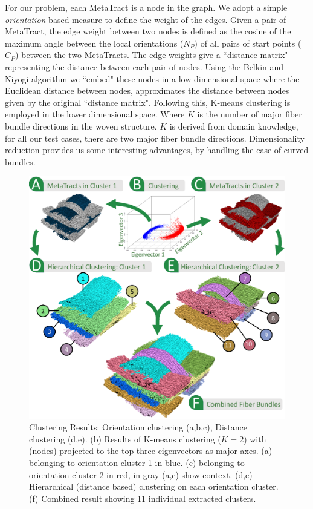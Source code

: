 For our problem, each MetaTract is a node in the graph. We adopt a simple \textit{orientation} based measure to define the weight of the edges. Given a pair of MetaTract, the edge weight between two nodes is defined as the cosine of the maximum angle between the local orientations ($N_P$) of all pairs of start points ($C_P$) between the two MetaTracts. The edge weights give a ``distance matrix" representing the distance between each pair of nodes. Using the Belkin and Niyogi algorithm we ``embed" these nodes in a low dimensional space where the Euclidean distance between nodes, approximates the distance between nodes given by the original ``distance matrix". 
Following this, K-means clustering is employed in the lower dimensional space. Where $K$ is the number of major fiber bundle directions in the woven structure. $K$ is derived from domain knowledge,
for all our test cases, there are two major fiber bundle directions. 
Dimensionality reduction provides us some interesting advantages, by handling the case of curved bundles.
\begin{figure}[t] 
	\centering  	
	\includegraphics[width=\linewidth]{images/clustering.eps}
	\caption{Clustering Results: Orientation clustering (a,b,c), Distance clustering (d,e).
		 (b) Results of K-means clustering ($K=2$) with \mt (nodes) projected to the top three eigenvectors as major axes. (a) \mt belonging to orientation cluster 1 in blue. (c) \mt belonging to orientation cluster 2 in red, \mt in gray (a,c) show context.
		(d,e) Hierarchical (distance based) clustering on each orientation cluster. (f) Combined result showing 11 individual extracted clusters. }
	\label{fig:orientation_clustering}
	\vskip-0.2cm
\end{figure} 
